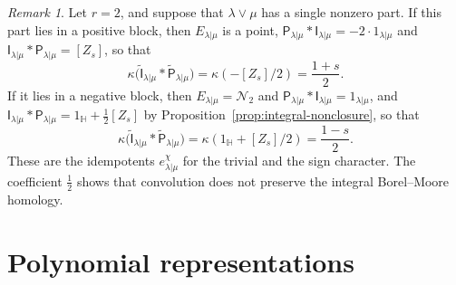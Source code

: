 \documentclass[11pt,a4paper]{amsart}
\theoremstyle{definition}
\theoremstyle{remark}
\newtheorem{remark}[theorem]{Remark}
\newcommand{\N}{\mathcal N}
\newcommand{\bH}{\mathbb H}
\newcommand{\lm}{\lambda|\mu}
\numberwithin{equation}{section}
\begin{document}
\begin{remark}\label{rem:ranktwo}
Let $r=2$, and suppose that $\lambda\vee\mu$ has a single nonzero part.
If this part lies in a positive block, then $E_{\lm}$ is a point,
$\mathsf P_{\lm}*\mathsf I_{\lm}=-2\cdot1_{\lm}$ and
$\mathsf I_{\lm}*\mathsf P_{\lm}=[Z_s]$, so that
$$
\kappa\bigl(\widetilde{\mathsf I}_{\lm}*\widetilde{\mathsf P}_{\lm}\bigr)
=\kappa(-[Z_s]/2)=\frac{1+s}{2}.
$$
If it lies in a negative block, then $E_{\lm}=\N_2$ and
$\mathsf P_{\lm}*\mathsf I_{\lm}=1_{\lm}$, and
$\mathsf I_{\lm}*\mathsf P_{\lm}=1_{\bH}+\tfrac12[Z_s]$ by
Proposition~\ref{prop:integral-nonclosure}, so that
$$
\kappa\bigl(\widetilde{\mathsf I}_{\lm}*\widetilde{\mathsf P}_{\lm}\bigr)
=\kappa(1_{\bH}+[Z_s]/2)=\frac{1-s}{2}.
$$
These are the idempotents $e^\chi_{\lm}$ for the trivial and the sign
character. The coefficient $\tfrac12$ shows that convolution does not
preserve the integral Borel--Moore homology.
\end{remark}


\section{Polynomial representations}
\label{sec:simples}
\end{document}
